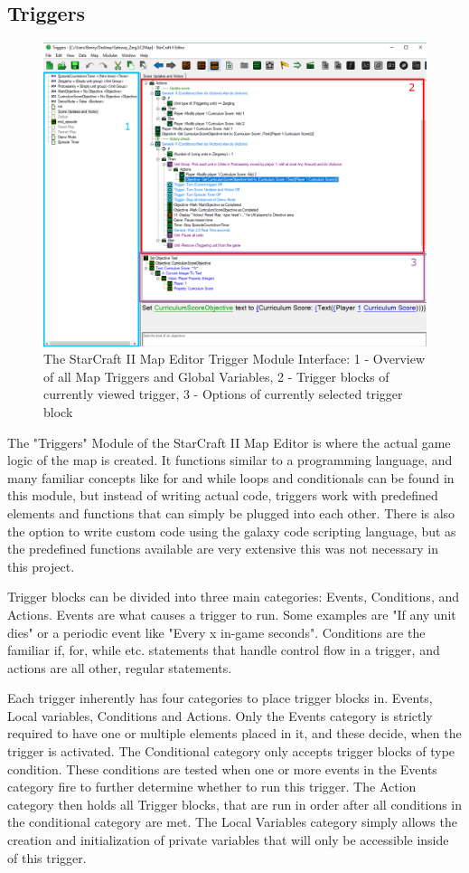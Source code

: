 \subsection{Triggers}
\begin{figure}[htb]
  \centering
      \includegraphics[width=1\textwidth]{Figures/Triggers_bordered.png}
  \caption{The StarCraft II Map Editor Trigger Module Interface: 1 - Overview of all Map Triggers and Global Variables, 2 - Trigger blocks of currently viewed trigger, 3 - Options of currently selected trigger block}
\end{figure}
The "Triggers" Module of the StarCraft II Map Editor is where the actual game logic of the map is created. It functions similar to a programming language, and many familiar concepts like for and while loops and conditionals can be found in this module, but instead of writing actual code, triggers work with predefined elements and functions that can simply be plugged into each other. There is also the option to write custom code using the galaxy code scripting language, but as the predefined functions available are very extensive this was not necessary in this project.

Trigger blocks can be divided into three main categories: Events, Conditions, and Actions.
Events are what causes a trigger to run. Some examples are "If any unit dies" or a periodic event like "Every x in-game seconds". Conditions are the familiar if, for, while etc. statements that handle control flow in a trigger, and actions are all other, regular statements.

Each trigger inherently has four categories to place trigger blocks in. Events, Local variables, Conditions and Actions. Only the Events category is strictly required to have one or multiple elements placed in it, and these decide, when the trigger is activated. The Conditional category only accepts trigger blocks of type condition. These conditions are tested when one or more events in the Events category fire to further determine whether to run this trigger. The Action category then holds all Trigger blocks, that are run in order after all conditions in the conditional category are met. The Local Variables category simply allows the creation and initialization of private variables that will only be accessible inside of this trigger.

